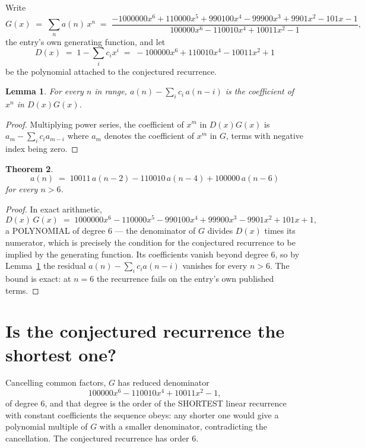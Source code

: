 \documentclass[11pt,a4paper]{article}
\theoremstyle{plain}
\newtheorem{theorem}{Theorem}
\newtheorem{lemma}[theorem]{Lemma}
\theoremstyle{definition}
\begin{document}
Write
\[
G(x)\;=\;\sum_{n}a(n)\,x^{n}\;=\;\frac{- 1000000 x^{6} + 110000 x^{5} + 990100 x^{4} - 99900 x^{3} + 9901 x^{2} - 101 x - 1}{100000 x^{6} - 110010 x^{4} + 10011 x^{2} - 1},
\]
the entry's own generating function, and let
\[
D(x)\;=\;1-\sum_i c_i x^{i}\;=\;- 100000 x^{6} + 110010 x^{4} - 10011 x^{2} + 1
\]
be the polynomial attached to the conjectured recurrence.

\begin{lemma}\label{lem:key}
For every $n$ in range, $a(n)-\sum_i c_i\,a(n-i)$ is the coefficient of $x^{n}$ in
$D(x)G(x)$.
\end{lemma}

\begin{proof}
Multiplying power series, the coefficient of $x^{m}$ in $D(x)G(x)$ is
$a_m-\sum_i c_i a_{m-i}$ where $a_m$ denotes the coefficient of $x^{m}$ in $G$, terms with
negative index being zero.
\end{proof}

\begin{theorem}
\[
a(n)\;=\;10011\,a(n-2) - 110010\,a(n-4) + 100000\,a(n-6)
\]
for every $n>6$.
\end{theorem}

\begin{proof}
In exact arithmetic,
\[
D(x)\,G(x)\;=\;1000000 x^{6} - 110000 x^{5} - 990100 x^{4} + 99900 x^{3} - 9901 x^{2} + 101 x + 1,
\]
a POLYNOMIAL of degree $6$ --- the denominator of $G$ divides $D(x)$ times its numerator,
which is precisely the condition for the conjectured recurrence to be implied by the
generating function. Its coefficients vanish beyond degree $6$, so by
Lemma~\ref{lem:key} the residual $a(n)-\sum_ic_ia(n-i)$ vanishes for every
$n>6$. The bound is exact: at $n=6$ the recurrence fails on the entry's own published terms.
\end{proof}

\section{Is the conjectured recurrence the shortest one?}

Cancelling common factors, $G$ has reduced denominator
\[
100000 x^{6} - 110010 x^{4} + 10011 x^{2} - 1,
\]
of degree $6$, and that degree is the order of the SHORTEST linear recurrence with
constant coefficients the sequence obeys: any shorter one would give a polynomial multiple of
$G$ with a smaller denominator, contradicting the cancellation. The conjectured recurrence has
order $6$.
\end{document}
